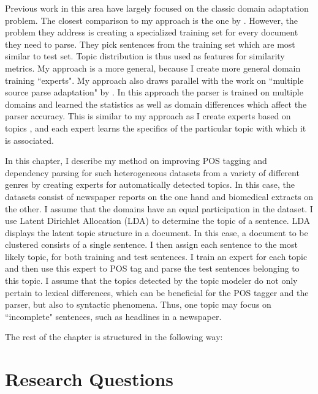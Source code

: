 Previous work in this area have largely focused on the classic domain adaptation problem. The closest comparison to my approach is the one by \cite{plank2011effective}. However, the problem they address is creating a specialized training set for every document they need to parse. They pick sentences from the training set which are most similar to test set. Topic distribution is thus used as features for similarity metrics. My approach is a more general, because I create more general domain training ``experts". My approach also draws parallel with the work on ``multiple source parse adaptation" by \cite{mcclosky2010automatic}. In this approach the parser is trained on multiple domains and learned the statistics as well as  domain differences which affect the parser accuracy. This is similar to my approach as I create experts based on topics , and each expert learns the specifics of the particular topic with which it is associated.

In this chapter, I describe my method on improving POS tagging and dependency parsing for such heterogeneous datasets from a variety of different genres by creating experts for automatically detected topics. In this case, the datasets consist of newspaper reports on the one hand and biomedical extracts on the other. I assume that the domains have an equal participation in the dataset. I use Latent Dirichlet Allocation (LDA) to determine the topic of a sentence. LDA displays the latent topic structure in a document. In this case, a document to be clustered consists of a single sentence. I then assign each sentence to the most likely topic, for both training and test sentences. I train an expert for each topic and then use this expert to POS tag and parse the test sentences belonging to this topic. I assume that the topics detected by the topic modeler do not only pertain to lexical differences, which can be beneficial for the POS tagger and the parser, but also to syntactic phenomena. Thus, one topic may focus on ``incomplete" sentences, such as headlines in a newspaper.

The rest of the chapter is structured in the following way: 


\section{Research Questions}\label{sec:quest}

